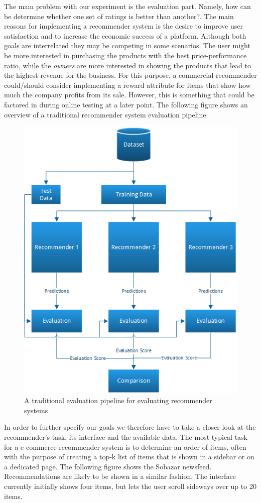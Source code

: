 The main problem with our experiment is the evaluation part. Namely, how can be determine
whether one set of ratings is better than another?. The main reasons for implementing a
recommender system is the desire to improve user satisfaction and to increase the economic
success of a platform. Although both goals are interrelated they may be competing in some
scenarios. The user might be more interested in purchasing the products with the best
price-performance ratio, while the \emph{owners}
are more interested in showing the products that lead to the highest revenue for the
business. For this purpose, a commercial recommender could/should consider implementing
a reward attribute for items that show how much the company profits from its sale. However,
this is something that could be factored in during online testing at a later point.
The following figure shows an overview of a traditional recommender system evaluation
pipeline:

\begin{figure}[H]
		\centering
	  	\includegraphics[height=0.65\linewidth]{image/evaluationpipeline.png}
		\caption[A Traditional Evaluation Pipeline]{A traditional evaluation pipeline for evaluating recommender systems}
		\label{figure:evaluationpipeline}
\end{figure}

In order to further specify our goals we therefore have to take a closer look at the recommender's task,
its interface and the available data. The most typical task for a e-commerce recommender system is to determine an order of items, often with the purpose of creating a top-k list of items that is shown in a sidebar or on a
dedicated page. The following figure shows the Sobazar newsfeed. Recommendations are likely to be shown in a similar fashion. The interface currently initially shows four items, but lets the user scroll sideways over up to 20 items.

